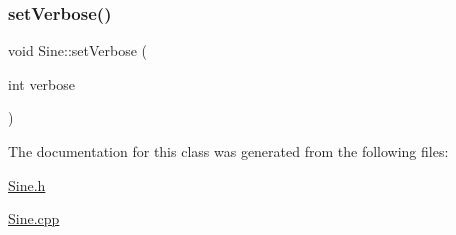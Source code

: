 \subsubsection{\texorpdfstring{set\+Verbose()}{setVerbose()}}
{\footnotesize\ttfamily void Sine\+::set\+Verbose (\begin{DoxyParamCaption}\item[{int}]{verbose }\end{DoxyParamCaption})}



The documentation for this class was generated from the following files\+:\begin{DoxyCompactItemize}
\item 
\mbox{\hyperlink{_sine_8h}{Sine.\+h}}\item 
\mbox{\hyperlink{_sine_8cpp}{Sine.\+cpp}}\end{DoxyCompactItemize}
